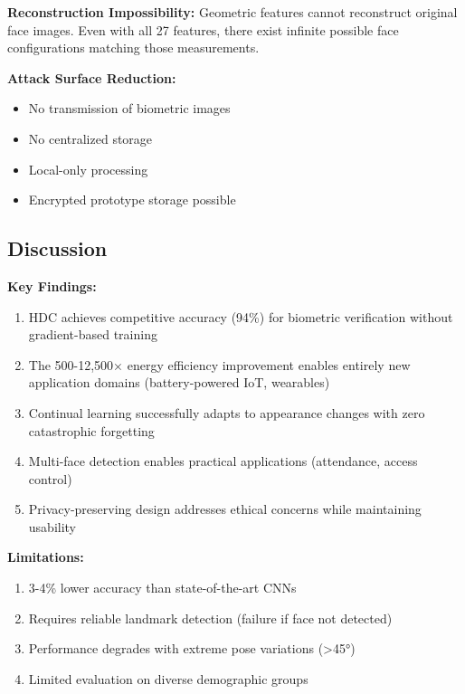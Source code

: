 \documentclass[a4paper,12pt]{article}
\begin{document}
\textbf{Reconstruction Impossibility:}
Geometric features cannot reconstruct original face images. Even with all 27 features, there exist infinite possible face configurations matching those measurements.

\textbf{Attack Surface Reduction:}
\begin{itemize}
    \item No transmission of biometric images
    \item No centralized storage
    \item Local-only processing
    \item Encrypted prototype storage possible
\end{itemize}

\subsection{Discussion}

\textbf{Key Findings:}

\begin{enumerate}
    \item HDC achieves competitive accuracy (94\%) for biometric verification without gradient-based training
    
    \item The 500-12,500× energy efficiency improvement enables entirely new application domains (battery-powered IoT, wearables)
    
    \item Continual learning successfully adapts to appearance changes with zero catastrophic forgetting
    
    \item Multi-face detection enables practical applications (attendance, access control)
    
    \item Privacy-preserving design addresses ethical concerns while maintaining usability
\end{enumerate}

\textbf{Limitations:}

\begin{enumerate}
    \item 3-4\% lower accuracy than state-of-the-art CNNs
    \item Requires reliable landmark detection (failure if face not detected)
    \item Performance degrades with extreme pose variations (>45°)
    \item Limited evaluation on diverse demographic groups
\end{enumerate}
\end{document}
